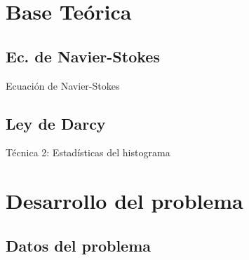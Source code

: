 \documentclass[spanish]{beamer}
\begin{document}
\section{Base Teórica}
%
\subsection{Ec. de Navier-Stokes}
\begin{frame}{Ecuación de Navier-Stokes}
\end{frame}
%
\subsection{Ley de Darcy}
\begin{frame}{Técnica 2: Estadísticas del histograma}
\end{frame}
%
\section{Desarrollo del problema}
%
\subsection{Datos del problema}
\end{document}
